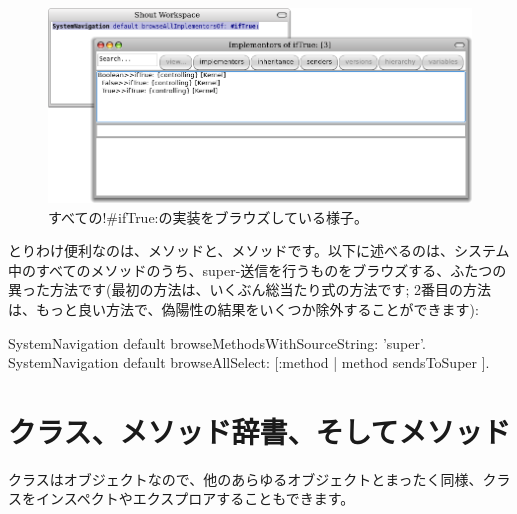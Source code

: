 \documentclass[a4paper,10pt,twoside]{book}
\begin{document}
\begin{figure}[ht]\centering
	\includegraphics[width=\linewidth]{implementors}
	\caption{すべての\ct!\#ifTrue:の実装をブラウズしている様子。}
\end{figure}

とりわけ便利なのは、メソッドと、メソッドです。以下に述べるのは、システム中のすべてのメソッドのうち、super-送信を行うものをブラウズする、ふたつの異った方法です(最初の方法は、いくぶん総当たり式の方法です; 2番目の方法は、もっと良い方法で、偽陽性の結果をいくつか除外することができます): %
\begin{code}{}
SystemNavigation default browseMethodsWithSourceString: 'super'.
SystemNavigation default browseAllSelect: [:method | method sendsToSuper ].
\end{code}

\section{クラス、メソッド辞書、そしてメソッド}

クラスはオブジェクトなので、他のあらゆるオブジェクトとまったく同様、クラスをインスペクトやエクスプロアすることもできます。
\end{document}
